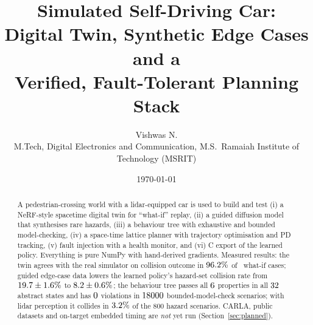 \documentclass[11pt,a4paper]{article}
\title{\textbf{Simulated Self-Driving Car:\\Digital Twin, Synthetic Edge Cases and a\\Verified, Fault-Tolerant Planning Stack}}
\author{Vishwas N.\\ M.Tech, Digital Electronics and Communication, M.S.\ Ramaiah Institute of Technology (MSRIT)}
\date{\today}
\begin{document}
\maketitle
\begin{abstract}
\noindent A pedestrian-crossing world with a lidar-equipped car is used to build and test (i) a NeRF-style spacetime digital twin for ``what-if'' replay, (ii) a guided diffusion model that synthesises rare hazards, (iii) a behaviour tree with exhaustive and bounded model-checking, (iv) a space-time lattice planner with trajectory optimisation and PD tracking, (v) fault injection with a health monitor, and (vi) C export of the learned policy. Everything is pure NumPy with hand-derived gradients. Measured results: the twin agrees with the real simulator on collision outcome in $96.2\%$ of \wiNcfg\ what-if cases; guided edge-case data lowers the learned policy's hazard-set collision rate from $19.7 \pm 1.6\%$ to $8.2 \pm 0.6\%$; the behaviour tree passes all $6$ properties in all $32$ abstract states and has $0$ violations in $18000$ bounded-model-check scenarios; with lidar perception it collides in $3.2\%$ of the 800 hazard scenarios. CARLA, public datasets and on-target embedded timing are \emph{not} yet run (Section~\ref{sec:planned}).
\end{abstract}

\tableofcontents






\appendix

\end{document}
